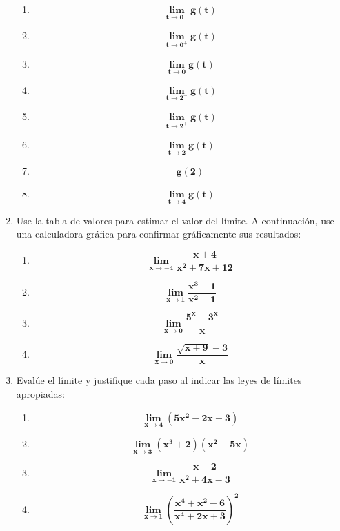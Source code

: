 \documentclass[12pt]{article}
\begin{document}
\begin{enumerate}
                \begin{enumerate}[label=\textbf{\alph*.}]
                    \item \[\bm{\lim_{t \to 0 ^-} g(t)}\]
                    \item \[\bm{\lim_{t \to 0 ^+} g(t)}\]
                    \item \[\bm{\lim_{t \to 0} g(t)}\]
                    \item \[\bm{\lim_{t \to 2 ^-} g(t)}\]
                    \item \[\bm{\lim_{t \to 2 ^+} g(t)}\]
                    \item \[\bm{\lim_{t \to 2} g(t)}\]
                    \item \[\bm{g(2)}\]
                    \item \[\bm{\lim_{t \to 4} g(t)}\]
                \end{enumerate}
            
            \item Use la tabla de valores para estimar el valor del límite. A continuación, use una calculadora gráfica para confirmar gráficamente sus resultados:
                \begin{enumerate}[label=\textbf{\arabic*)}] 
                    \item \[\bm{\lim_{x \to -4} \frac{x + 4}{x ^2 + 7x + 12}}\]
                    \item \[\bm{\lim_{x \to 1} \frac{x ^3 - 1}{x ^2 - 1}}\]
                    \item \[\bm{\lim_{x \to 0} \frac{5 ^x - 3^x }{x}}\]
                    \item \[\bm{\lim_{x \to 0} \frac{\sqrt{x + 9} - 3}{x}}\]
                \end{enumerate}

            
            \item Evalúe el límite y justifique cada paso al indicar las leyes de límites apropiadas:
                \begin{enumerate}[label=\textbf{\arabic*)}] 
                    \item \[\bm{\lim_{x \to 4} (5x ^2 - 2x + 3)}\]
                    \item \[\bm{\lim_{x \to 3} (x ^3 + 2)(x ^2 - 5x)}\]
                    \item \[\bm{\lim_{x \to -1} \frac{x - 2 }{x ^2 + 4x - 3}}\]
                    \item \[\bm{\lim_{x \to 1} \left(\frac{x^4 + x^2 - 6}{x^4 + 2x + 3}\right)^2}\]
                \end{enumerate}


\end{enumerate}
\end{document}
